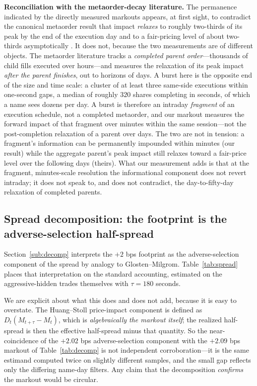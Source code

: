 \documentclass[11pt]{article}
\begin{document}
\textbf{Reconciliation with the metaorder-decay literature.} The permanence indicated by the
directly measured markouts appears, at first sight, to contradict the canonical metaorder result that impact
\emph{relaxes} to roughly two-thirds of its peak by the end of the execution day
\citep{bucci2019} and to a fair-pricing level of about two-thirds asymptotically
\citep{farmer2013}. It does not, because the two measurements are of different objects. The
metaorder literature tracks a \emph{completed parent order}---thousands of child fills
executed over hours---and measures the relaxation of its peak impact \emph{after the parent
finishes}, out to horizons of days. A burst here is the opposite end of the size and time
scale: a cluster of at least three same-side executions within one-second gaps, a median of
roughly $320$ shares completing in seconds, of which a name sees dozens per day. A burst is
therefore an intraday \emph{fragment} of an execution schedule, not a completed metaorder,
and our markout measures the forward impact of that fragment over minutes within the same
session---not the post-completion relaxation of a parent over days. The two are not in
tension: a fragment's information can be permanently impounded within minutes (our result)
while the aggregate parent's peak impact still relaxes toward a fair-price level over the
following days (theirs). What our measurement adds is that at the fragment, minutes-scale
resolution the informational component does not revert intraday; it does not speak to, and
does not contradict, the day-to-fifty-day relaxation of completed parents.

\subsection{Spread decomposition: the footprint is the adverse-selection half-spread}
\label{sub:spread}
Section~\ref{sub:decomp} interprets the $+2$ bps footprint as the adverse-selection
component of the spread by analogy to Glosten--Milgrom. Table~\ref{tab:spread} places that
interpretation on the standard \citet{huangstoll1997} accounting, estimated on the
aggressive-hidden trades themselves with $\tau = 180$ seconds.

We are explicit about what this does and does not add, because it is easy to overstate.
The Huang--Stoll price-impact component is defined as $D_t(M_{t+\tau} - M_t)$, which is
\emph{algebraically the markout itself}; the realized half-spread is then the effective
half-spread minus that quantity. So the near-coincidence of the $+2.02$ bps
adverse-selection component with the $+2.09$ bps markout of Table~\ref{tab:decomp} is not
independent corroboration---it is the same estimand computed twice on slightly different
samples, and the small gap reflects only the differing name-day filters. Any claim that the
decomposition \emph{confirms} the markout would be circular.
\end{document}
